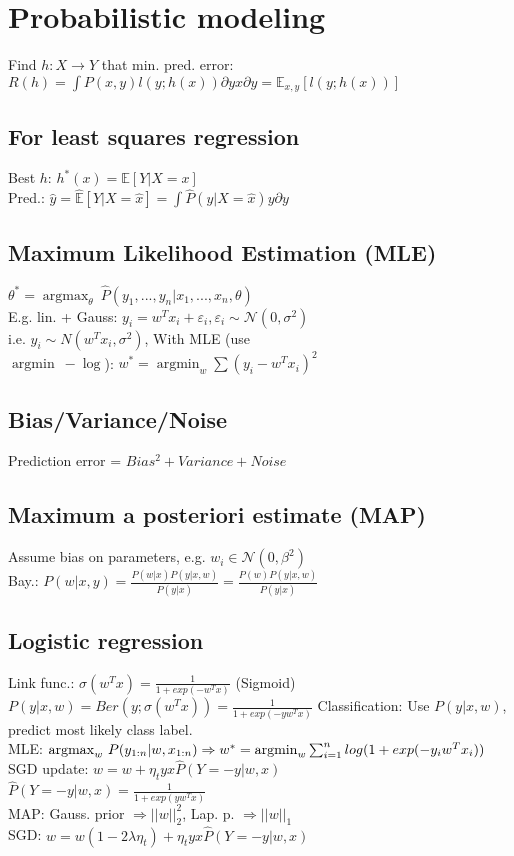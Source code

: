 \section*{Probabilistic modeling}
Find $h:X\rightarrow Y$ that min. pred. error: 
$R(h) = \int P(x,y)l(y;h(x)) \partial yx \partial y = \mathbb{E}_{x,y}[l(y;h(x))]$

\subsection*{For least squares regression}
Best $h$: $h^*(x) = \mathbb{E}[Y|X=x]$ \\
Pred.: $\hat{y} = \hat{\mathbb{E}}[Y|X=\hat{x}] = \int \hat{P}(y|X=\hat{x}) y \partial y$

\subsection*{Maximum Likelihood Estimation (MLE)}
$\theta^* = {\operatorname{argmax}_{\theta}} ~ \hat{P}(y_1,...,y_n|x_1,...,x_n,\theta)$\\
E.g. lin. + Gauss: $y_i = w^T x_i + \varepsilon_i, \varepsilon_i \sim \mathcal{N}(0, \sigma^2)$\\
i.e. $y_i \sim N(w^T x_i, \sigma^2)$, With MLE (use\\ $\operatorname{argmin} ~ - \operatorname{log}$): $w^* = {\operatorname{argmin}_w} \sum (y_i-w^Tx_i)^2$

\subsection*{Bias/Variance/Noise}
Prediction error = $Bias^2 + Variance + Noise$

\subsection*{Maximum a posteriori estimate (MAP)}
Assume bias on parameters, e.g. $w_i \in \mathcal{N}(0, \beta^2)$\\
Bay.: $P(w|x,y) = \frac{P(w|x) P(y|x,w)}{P(y|x)} = \frac{P(w) P(y|x,w)}{P(y|x)}$

\subsection*{Logistic regression}
Link func.: $\sigma(w^Tx) = \frac{1}{1+exp(-w^Tx)}$ (Sigmoid)\\
$P(y|x,w) = Ber(y; \sigma(w^Tx)) = \frac{1}{1+exp(-y w^T x)}$
Classification: Use $P(y|x,w)$, predict most likely class label.\\
MLE: ${\operatorname{argmax}_w} ~ P(y_{1:n}|w,x_{1:n})\\
\Rightarrow w^* = {\operatorname{argmin}_w} \sum_{i=1}^n log(1+exp(-y_i w^T x_i))$\\
SGD update: $w = w + \eta_t y x \hat{P}(Y = -y|w,x)$\\
$\hat{P}(Y = -y|w,x) = \frac{1}{1+exp(yw^Tx)}$\\
MAP: Gauss. prior $\Rightarrow ||w||_2^2$, Lap. p. $\Rightarrow||w||_1$\\
SGD: $w = w (1-2\lambda \eta_t) + \eta_t y x \hat{P}(Y = -y|w,x)$